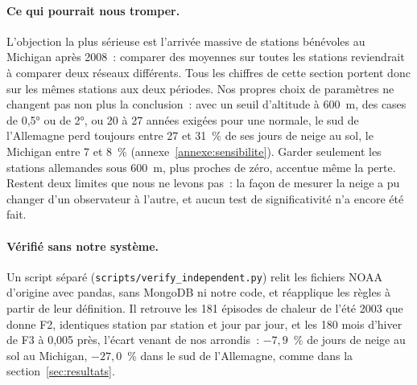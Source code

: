\paragraph{Ce qui pourrait nous tromper.}
L'objection la plus sérieuse est l'arrivée massive de stations bénévoles au Michigan après 2008~: comparer des moyennes sur toutes les stations reviendrait à comparer deux réseaux différents. Tous les chiffres de cette section portent donc sur les mêmes stations aux deux périodes. Nos propres choix de paramètres ne changent pas non plus la conclusion~: avec un seuil d'altitude à 600~m, des cases de 0,5° ou de 2°, ou 20 à 27 années exigées pour une normale, le sud de l'Allemagne perd toujours entre 27 et 31~\% de ses jours de neige au sol, le Michigan entre 7 et 8~\% (annexe~\ref{annexe:sensibilite}). Garder seulement les stations allemandes sous 600~m, plus proches de zéro, accentue même la perte. Restent deux limites que nous ne levons pas~: la façon de mesurer la neige a pu changer d'un observateur à l'autre, et aucun test de significativité n'a encore été fait.

\paragraph{Vérifié sans notre système.} Un script séparé (\texttt{scripts/verify\_independent.py}) relit les fichiers NOAA d'origine avec pandas, sans MongoDB ni notre code, et réapplique les règles à partir de leur définition. Il retrouve les 181 épisodes de chaleur de l'été 2003 que donne F2, identiques station par station et jour par jour, et les 180 mois d'hiver de F3 à 0,005 près, l'écart venant de nos arrondis~: $-7,9$~\% de jours de neige au sol au Michigan, $-27,0$~\% dans le sud de l'Allemagne, comme dans la section~\ref{sec:resultats}.
